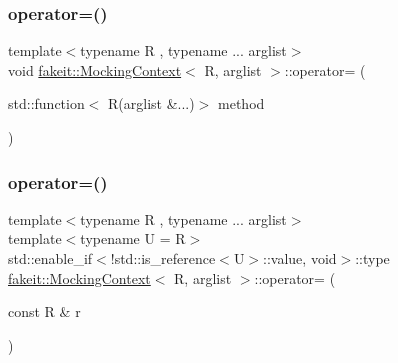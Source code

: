 \subsubsection{\texorpdfstring{operator=()}{operator=()}\hspace{0.1cm}{\footnotesize\ttfamily [22/27]}}
{\footnotesize\ttfamily template$<$typename R , typename ... arglist$>$ \\
void \mbox{\hyperlink{classfakeit_1_1MockingContext}{fakeit\+::\+Mocking\+Context}}$<$ R, arglist $>$\+::operator= (\begin{DoxyParamCaption}\item[{std\+::function$<$ R(arglist \&...)$>$}]{method }\end{DoxyParamCaption})\hspace{0.3cm}{\ttfamily [inline]}}

\mbox{\label{classfakeit_1_1MockingContext_adfac3df2408adaa86efec81bd5533a6d}} 
\subsubsection{\texorpdfstring{operator=()}{operator=()}\hspace{0.1cm}{\footnotesize\ttfamily [23/27]}}
{\footnotesize\ttfamily template$<$typename R , typename ... arglist$>$ \\
template$<$typename U  = R$>$ \\
std\+::enable\+\_\+if$<$!std\+::is\+\_\+reference$<$U$>$\+::value, void$>$\+::type \mbox{\hyperlink{classfakeit_1_1MockingContext}{fakeit\+::\+Mocking\+Context}}$<$ R, arglist $>$\+::operator= (\begin{DoxyParamCaption}\item[{const R \&}]{r }\end{DoxyParamCaption})\hspace{0.3cm}{\ttfamily [inline]}}

\mbox{\label{classfakeit_1_1MockingContext_ad5e903b223858dbe67f1da1523ef0d60}} 

